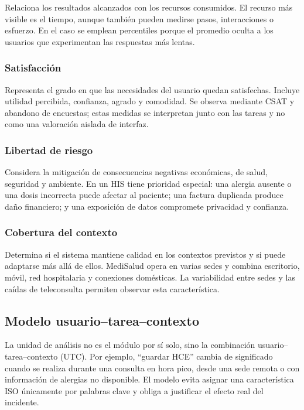 Relaciona los resultados alcanzados con los recursos consumidos. El recurso más visible es el tiempo, aunque también pueden medirse pasos, interacciones o esfuerzo. En el caso se emplean percentiles porque el promedio oculta a los usuarios que experimentan las respuestas más lentas.

\subsubsection{Satisfacción}

Representa el grado en que las necesidades del usuario quedan satisfechas. Incluye utilidad percibida, confianza, agrado y comodidad. Se observa mediante CSAT y abandono de encuestas; estas medidas se interpretan junto con las tareas y no como una valoración aislada de interfaz.

\subsubsection{Libertad de riesgo}

Considera la mitigación de consecuencias negativas económicas, de salud, seguridad y ambiente. En un HIS tiene prioridad especial: una alergia ausente o una dosis incorrecta puede afectar al paciente; una factura duplicada produce daño financiero; y una exposición de datos compromete privacidad y confianza.

\subsubsection{Cobertura del contexto}

Determina si el sistema mantiene calidad en los contextos previstos y si puede adaptarse más allá de ellos. MediSalud opera en varias sedes y combina escritorio, móvil, red hospitalaria y conexiones domésticas. La variabilidad entre sedes y las caídas de teleconsulta permiten observar esta característica.

\subsection{Modelo usuario--tarea--contexto}

La unidad de análisis no es el módulo por sí solo, sino la combinación usuario--tarea--contexto (UTC). Por ejemplo, ``guardar HCE'' cambia de significado cuando se realiza durante una consulta en hora pico, desde una sede remota o con información de alergias no disponible. El modelo evita asignar una característica ISO únicamente por palabras clave y obliga a justificar el efecto real del incidente.

